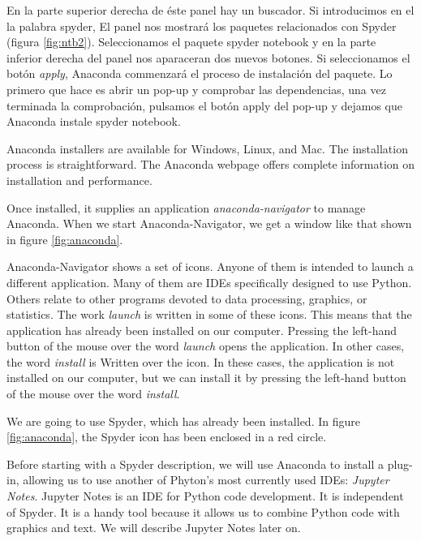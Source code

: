 \begin{paracol}{2}
 En la parte superior derecha de éste panel hay un buscador. Si introducimos en el la palabra spyder, El panel nos mostrará los paquetes relacionados con Spyder (figura \ref{fig:ntb2}). Seleccionamos el paquete spyder notebook y en la parte inferior derecha del panel nos aparaceran dos nuevos botones. Si seleccionamos el botón \emph{apply}, Anaconda commenzará el proceso de instalación del paquete. Lo primero que hace es abrir un pop-up y comprobar las dependencias, una vez terminada la comprobación, pulsamos el botón apply del pop-up y dejamos que Anaconda instale spyder notebook.
 

 \switchcolumn
 Anaconda installers are available for Windows, Linux, and Mac. The installation process is straightforward. The Anaconda webpage offers complete information on installation and performance.

 Once installed, it supplies an application \emph{anaconda-navigator} to manage Anaconda. When we start Anaconda-Navigator, we get a window like that shown in figure \ref{fig:anaconda}.

 Anaconda-Navigator shows a set of icons. Anyone of them is intended to launch a different application. Many of them are IDEs specifically designed to use Python. Others relate to other programs devoted to data processing, graphics, or statistics. The work \emph{launch} is written in some of these icons. This means that the application has already been installed on our computer. Pressing the left-hand button of the mouse over the word \emph{launch} opens the application. In other cases, the word \emph{install} is Written over the icon. In these cases, the application is not installed on our computer, but we can install it by pressing the left-hand button of the mouse over the word \emph{install}.

 We are going to use Spyder, which has already been installed. In figure \ref{fig:anaconda}, the Spyder icon has been enclosed in a red circle.

 Before starting with a Spyder description, we will use Anaconda to install a plug-in, allowing us to use another of Phyton's most currently used IDEs: \emph{Jupyter Notes}. Jupyter Notes is an IDE for Python code development.  It is independent of Spyder. It is a handy tool because it allows us to combine Python code with graphics and text. We will describe Jupyter Notes later on.


\end{paracol}

